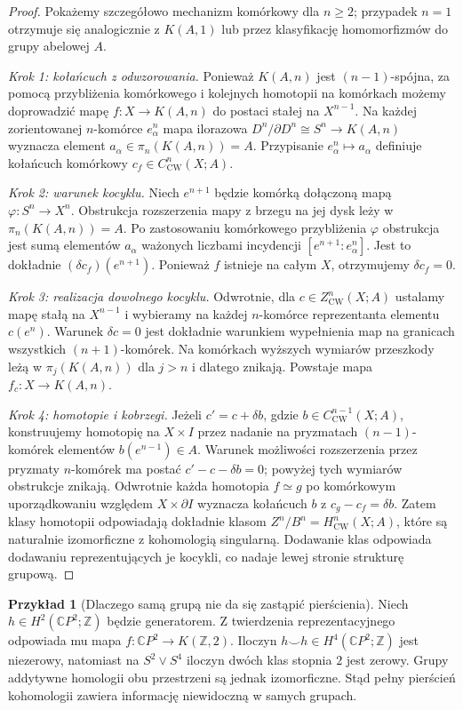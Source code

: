 \documentclass[11pt,a4paper,oneside]{report}
\newcommand{\C}{\mathbb{C}}
\newcommand{\Z}{\mathbb{Z}}
\theoremstyle{plain}
\theoremstyle{definition}
\newtheorem{przyklad}[twierdzenie]{Przykład}
\theoremstyle{remark}
\begin{document}
\begin{proof}
Pokażemy szczegółowo mechanizm komórkowy dla $n\ge2$;
przypadek $n=1$ otrzymuje się analogicznie z $K(A,1)$
lub przez klasyfikację homomorfizmów do grupy abelowej $A$.

\emph{Krok 1: kołańcuch z odwzorowania.}
Ponieważ $K(A,n)$ jest $(n-1)$-spójna, za pomocą
przybliżenia komórkowego i kolejnych homotopii na komórkach
możemy doprowadzić mapę $f:X\to K(A,n)$ do postaci
stałej na $X^{n-1}$. Na każdej zorientowanej $n$-komórce
$e^n_\alpha$ mapa ilorazowa
$D^n/\partial D^n\cong S^n\to K(A,n)$
wyznacza element $a_\alpha\in\pi_n(K(A,n))=A$.
Przypisanie $e^n_\alpha\mapsto a_\alpha$ definiuje
kołańcuch komórkowy $c_f\in C^n_{\mathrm{CW}}(X;A)$.

\emph{Krok 2: warunek kocyklu.}
Niech $e^{n+1}$ będzie komórką dołączoną mapą
$\varphi:S^n\to X^n$. Obstrukcja rozszerzenia mapy
z brzegu na jej dysk leży w $\pi_n(K(A,n))=A$.
Po zastosowaniu komórkowego przybliżenia $\varphi$
obstrukcja jest sumą elementów $a_\alpha$ ważonych
liczbami incydencji $[e^{n+1}:e^n_\alpha]$.
Jest to dokładnie $(\delta c_f)(e^{n+1})$.
Ponieważ $f$ istnieje na całym $X$, otrzymujemy
$\delta c_f=0$.

\emph{Krok 3: realizacja dowolnego kocyklu.}
Odwrotnie, dla $c\in Z^n_{\mathrm{CW}}(X;A)$
ustalamy mapę stałą na $X^{n-1}$ i wybieramy na
każdej $n$-komórce reprezentanta elementu $c(e^n)$.
Warunek $\delta c=0$ jest dokładnie warunkiem
wypełnienia map na granicach wszystkich $(n+1)$-komórek.
Na komórkach wyższych wymiarów przeszkody leżą
w $\pi_j(K(A,n))$ dla $j>n$ i dlatego znikają.
Powstaje mapa $f_c:X\to K(A,n)$.

\emph{Krok 4: homotopie i kobrzegi.}
Jeżeli $c'=c+\delta b$, gdzie
$b\in C^{n-1}_{\mathrm{CW}}(X;A)$, konstruujemy
homotopię na $X\times I$ przez nadanie na pryzmatach
$(n-1)$-komórek elementów $b(e^{n-1})\in A$.
Warunek możliwości rozszerzenia przez pryzmaty
$n$-komórek ma postać
$c'-c-\delta b=0$; powyżej tych wymiarów obstrukcje
znikają. Odwrotnie każda homotopia $f\simeq g$ po
komórkowym uporządkowaniu względem $X\times\partial I$
wyznacza kołańcuch $b$ z $c_g-c_f=\delta b$.
Zatem klasy homotopii odpowiadają dokładnie klasom
$Z^n/B^n=H^n_{\mathrm{CW}}(X;A)$, które są naturalnie
izomorficzne z kohomologią singularną.
Dodawanie klas odpowiada dodawaniu reprezentujących
je kocykli, co nadaje lewej stronie strukturę grupową.
\end{proof}

\begin{przyklad}[Dlaczego samą grupą nie da się zastąpić pierścienia]
Niech $h\in H^2(\C P^2;\Z)$ będzie generatorem.
Z twierdzenia reprezentacyjnego odpowiada mu mapa
$f:\C P^2\to K(\Z,2)$. Iloczyn
$h\smile h\in H^4(\C P^2;\Z)$ jest niezerowy,
natomiast na $S^2\vee S^4$ iloczyn dwóch klas
stopnia $2$ jest zerowy. Grupy addytywne homologii
obu przestrzeni są jednak izomorficzne. Stąd pełny
pierścień kohomologii zawiera informację niewidoczną
w samych grupach.
\end{przyklad}
\end{document}
